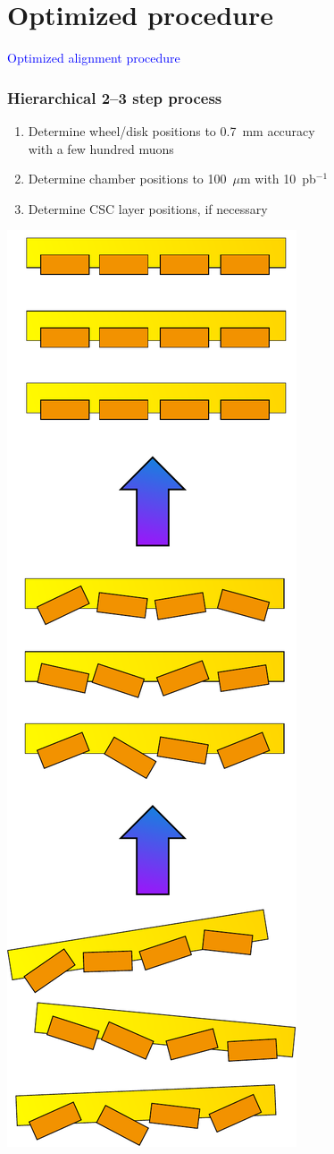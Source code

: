 \documentclass[compress]{beamer}
\begin{document}

\section*{Optimized procedure}

\begin{frame}
\begin{center}
\Huge \textcolor{blue}{Optimized alignment procedure}
\end{center}
\end{frame}

\begin{frame}
\frametitle{Hierarchical 2--3 step process}

\begin{enumerate}\setlength{\itemsep}{0.3 cm}
\item Determine wheel/disk positions to 0.7~mm accuracy \\ with
a few hundred muons
\item Determine chamber positions to 100~$\mu$m with 10~pb$^{-1}$
\item Determine CSC layer positions, if necessary
\end{enumerate}
\begin{center}
\includegraphics[height=\linewidth, angle=-90]{heirarchial_procedure.pdf}
\end{center}
\end{frame}
\end{document}
